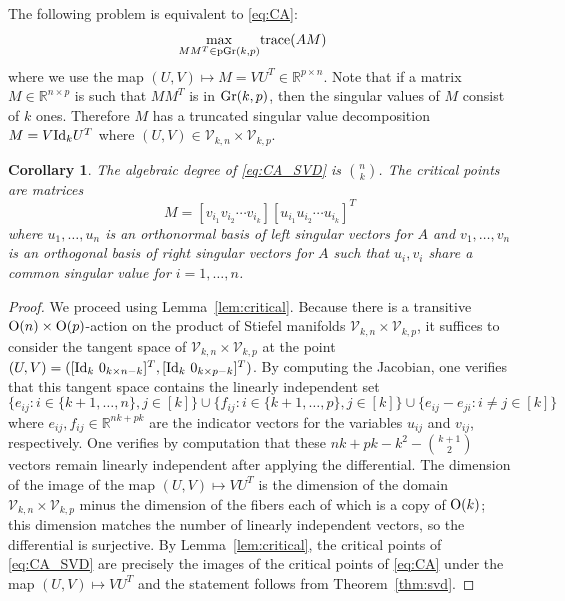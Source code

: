 \documentclass[12pt]{extarticle}
\newtheorem{corollary}[theorem]{Corollary}
\theoremstyle{definition}
\numberwithin{theorem}{section}
\begin{document}
The following problem  is equivalent to \eqref{eq:CA}:  
\begin{align} \label{eq:CA_SVD}
    \max_{MM^T \in {\rm pGr}(k,p)} &{\rm trace}(AM)
\end{align}
where we use the map $(U,V) \mapsto M = VU^T \in \mathbb{R}^{p \times n}$. Note that if a matrix 
$M \in \mathbb{R}^{n \times p}$ is such that 
$MM^T$ is in ${\rm Gr}(k,p)$, then the singular values of $M$ consist of $k$ ones. Therefore $M$
has a truncated singular value decomposition $M = V{\rm Id}_k U^T$ where $(U,V) \in \mathcal V_{k,n} \times \mathcal V_{k,p}$.
\begin{corollary}
The algebraic degree of \eqref{eq:CA_SVD} is $\binom{n}{k}$. The critical points are matrices $$M=[v_{i_1} v_{i_2} \cdots v_{i_k}] [u_{i_1} u_{i_2} \cdots u_{i_k}]^T$$ 
where $u_1, \ldots, u_n$ is an orthonormal basis of left singular vectors for $A$ and $v_1, \ldots, v_n$ is an orthogonal basis of right singular vectors for $A$ such that $u_i, v_i$ share a common singular value for $i =1, \ldots, n$. 
\end{corollary}
\begin{proof}
We proceed using Lemma~\ref{lem:critical}.
Because there is a transitive ${\rm O}(n) \times {\rm O}(p)$-action on the product of Stiefel manifolds $\mathcal V_{k,n} \times \mathcal V_{k,p}$, it suffices to consider the tangent space of $\mathcal V_{k,n} \times \mathcal V_{k,p}$ at the point $(U,V) = ([{\rm Id}_k \,\, 0_{k \times n-k}]^T, [{\rm Id}_k \,\, 0_{k \times p-k}]^T)$.
By computing the Jacobian, one verifies that this tangent space contains the linearly independent set 
\[\{e_{ij} : i \in \{k+1, \ldots, n\}, j \in [k] \} 
\cup \{f_{ij} : i \in \{k+1, \ldots, p\}, j \in [k] \} \cup \{e_{ij} - e_{ji}: i \neq j \in [k]\}\]
where $e_{ij}, f_{ij} \in \mathbb R^{nk + pk}$ are the indicator vectors for the variables $u_{ij}$ and $v_{ij}$, respectively.
One verifies by computation that these $nk + pk - k^2- \binom{k+1}{2}$ vectors remain linearly independent after applying the differential. 
The dimension of the image of the map $(U,V) \mapsto VU^T$ is the dimension of the domain $\mathcal V_{k,n} \times \mathcal V_{k,p}$ minus the dimension of the fibers each of which is a copy of ${\rm O}(k)$; this dimension matches the number of linearly independent vectors, so the differential is surjective.
By Lemma~\ref{lem:critical}, the critical points of \eqref{eq:CA_SVD} are precisely the images of the critical points of \eqref{eq:CA} under the map $(U,V) \mapsto VU^T$ and the statement follows from Theorem~\ref{thm:svd}.
\end{proof}
\end{document}
